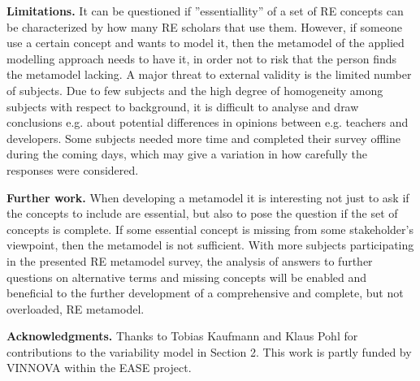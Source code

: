 \documentclass[a4paper]{llncs}
\begin{document}
{\bf Limitations. } It can be questioned if ''essentiallity'' of a set of RE concepts can be characterized by how many RE scholars that use them. However, if someone use a certain concept and wants to model it, then the metamodel of the applied modelling approach needs to have it, in order not to risk that the person finds the metamodel lacking. A major threat to external validity is the limited number of subjects. Due to few subjects and the high degree of homogeneity among subjects with respect to background, it is difficult to analyse and draw conclusions e.g. about potential differences in opinions between e.g. teachers and developers. Some subjects needed more time and completed their survey offline during the coming days, which may give a variation in how carefully the responses were considered. 
 
{\bf Further work.} When developing a metamodel it is interesting not just to ask if the concepts to include are essential, but also to pose the question if the set of concepts is complete. If some essential concept is missing from some stakeholder's viewpoint, then the metamodel is not sufficient.  With more subjects participating in the presented RE metamodel survey, the analysis of answers to further questions on alternative terms and missing concepts will be enabled and beneficial to the further development of a comprehensive and complete, but not overloaded, RE metamodel. %


\vspace{0.2cm}
{\small\noindent\textbf{Acknowledgments.} Thanks to Tobias Kaufmann and Klaus Pohl for contributions to the variability model in Section 2. This work is partly funded by  VINNOVA within the EASE project. }
\end{document}
